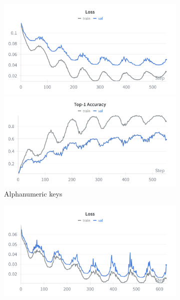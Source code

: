 \documentclass[a4paper,11pt,twoside]{report}
\theoremstyle{definition}
\begin{document}
\begin{figure}[H]
\centering

\begin{subfigure}{\linewidth}
    \centering
    \begin{minipage}{0.49\linewidth}
        \centering
        \includegraphics[width=\linewidth]{img_appendix/loss_all_swin_alphanum.png}
    \end{minipage}
    \hfill
    \begin{minipage}{0.49\linewidth}
        \centering
        \includegraphics[width=\linewidth]{img_appendix/acc_all_swin_alphanum.png}
    \end{minipage}
    \caption{Alphanumeric keys}
\end{subfigure}
\vspace{0.5em}
\begin{subfigure}{\linewidth}
    \centering
    \begin{minipage}{0.49\linewidth}
        \centering
        \includegraphics[width=\linewidth]{img_appendix/loss_all_swin_all.png}

\end{minipage}
\end{subfigure}
\end{figure}
\end{document}
